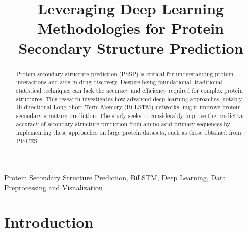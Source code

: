 \documentclass[conference]{IEEEtran}
\begin{document}
\title{Leveraging Deep Learning Methodologies for Protein Secondary Structure Prediction}

\author{
\and
{}
}

\maketitle

\begin{abstract}
Protein secondary structure prediction (PSSP) is critical for understanding protein interactions and aids in drug discovery. Despite being foundational, traditional statistical techniques can lack the accuracy and efficiency required for complex protein structures. This research investigates how advanced deep learning approaches, notably Bi-directional Long Short-Term Memory (Bi-LSTM) networks, might improve protein secondary structure prediction. The study seeks to considerably improve the predictive accuracy of secondary structure prediction from amino acid primary sequences by implementing these approaches on large protein datasets, such as those obtained from PISCES. \end{abstract}

\begin{IEEEkeywords}
Protein Secondary Structure Prediction, BiLSTM, Deep Learning, Data Preprocessing and Visualization
\end{IEEEkeywords}

\section{Introduction}
\end{document}
